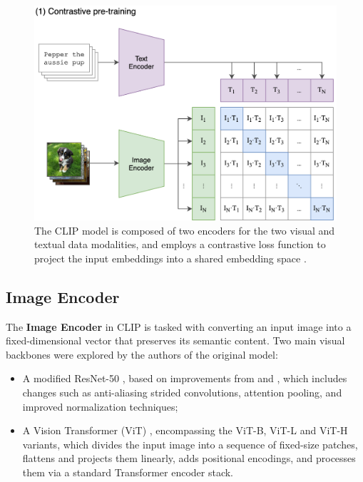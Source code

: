 \documentclass[a4paper, twoside, english]{sapthesis} %
\begin{document}
\begin{figure}[h]
    \centering
    \includegraphics[width=\textwidth]{img/CLIP-structure.png}
    \caption{\normalsize The CLIP model is composed of two encoders for the two visual and textual data modalities, and employs a contrastive loss function to project the input embeddings into a shared embedding space \cite{radford2021learning}.}
    \label{fig:clip}
\end{figure}


\subsection{Image Encoder}

The \textbf{Image Encoder} in CLIP is tasked with converting an input image into a fixed-dimensional vector that preserves its semantic content. Two main visual backbones were explored by the authors of the original model:

\begin{itemize}
    \item A modified ResNet-50 \cite{he2016deep}, based on improvements from \cite{he2019bag} and \cite{zhang2019making}, which includes changes such as anti-aliasing strided convolutions, attention pooling, and improved normalization techniques;
    \item A Vision Transformer (ViT) \cite{dosovitskiy2020image}, encompassing the ViT-B, ViT-L and ViT-H variants, which divides the input image into a sequence of fixed-size patches, flattens and projects them linearly, adds positional encodings, and processes them via a standard Transformer encoder stack.
\end{itemize}
\end{document}
